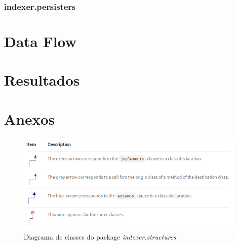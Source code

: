 \documentclass[12pt]{article}
\begin{document}
\subsubsection{indexer.persisters}

\section{Data Flow}

\section{Resultados}
\section{Anexos}

\begin{figure}[h]
  \center
  \includegraphics[width=16cm]{arrow_legend.png}
  \caption{Diagrama de classes do package \it indexer.structures}
\end{figure}

%
%
\end{document}
